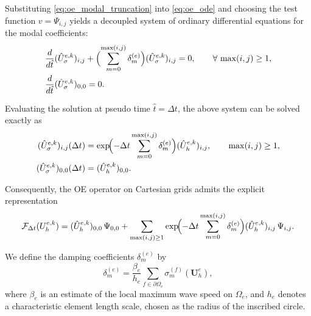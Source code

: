 \documentclass[fleqn,11pt]{amsart}
\begin{document}
Substituting \eqref{eq:oe_modal_truncation} into
\eqref{eq:oe_ode} and choosing the test function
$v=\Psi_{i,j}$ yields a decoupled system of ordinary differential
equations for the modal coefficients:
\begin{equation}
\label{eq:oe_modal_ode}
\begin{aligned}
&\frac{d}{d\hat t}(\hat U_{\sigma}^{e,k})_{i,j}
+ \Bigl(\sum_{m=0}^{\max(i,j)} \delta_m^{(e)}\Bigr)
(\hat U_{\sigma}^{e,k})_{i,j}
= 0,
\qquad \forall\, \max(i,j)\ge 1, \\
&\frac{d}{d\hat t}(\hat U_{\sigma}^{e,k})_{0,0} = 0.
\end{aligned}
\end{equation}

Evaluating the solution at pseudo time $\hat t=\Delta t$, the above
system can be solved exactly as
\begin{equation}
\label{eq:oe_coeff_cart}
\begin{aligned}
(\hat U_{\sigma}^{e,k})_{i,j}(\Delta t)
&=
\exp\!\Bigl(
-\Delta t \sum_{m=0}^{\max(i,j)} \delta_m^{(e)}
\Bigr)
(\hat U_{h}^{e,k})_{i,j},
\qquad \max(i,j)\ge 1, \\
(\hat U_{\sigma}^{e,k})_{0,0}(\Delta t)
&=
(\hat U_{h}^{e,k})_{0,0}.
\end{aligned}
\end{equation}

Consequently, the OE operator on Cartesian grids admits the explicit
representation
\begin{equation}
\label{eq:oe_operator_cart}
\mathcal F_{\Delta t}(U_h^{e,k})
=
(\hat U_h^{e,k})_{0,0}\,\Psi_{0,0}
+
\sum_{\max(i,j)\ge 1}
\exp\!\Bigl(
-\Delta t \sum_{m=0}^{\max(i,j)} \delta_m^{(e)}
\Bigr)
(\hat U_h^{e,k})_{i,j}\,\Psi_{i,j}.
\end{equation}

We define the damping coefficients $\delta_m^{(e)}$ by
\begin{equation}
\label{eq:oe_delta_cart}
\delta_m^{(e)}
=
\frac{\beta_e}{h_e}
\sum_{f\in\partial\Omega_e}
\sigma_m^{(f)}(\bm U_h^e),
\end{equation}
where $\beta_e$ is an estimate of the local maximum wave speed on
$\Omega_e$, and $h_e$ denotes a characteristic element length scale,
chosen as the radius of the inscribed circle.
\end{document}
